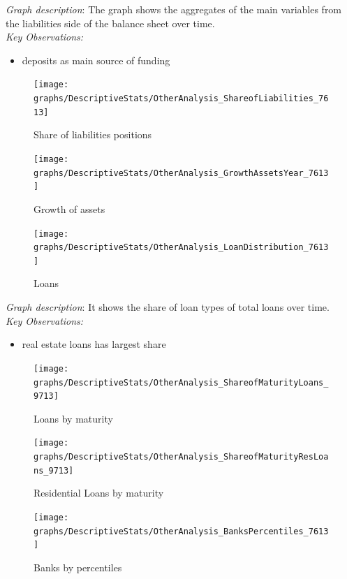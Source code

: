 \documentclass[12pt, a4paper]{article} %
\begin{document}
\noindent \textit{Graph description}: The graph shows the aggregates of the main variables from the liabilities side of the balance sheet over time.\\

\noindent \textit{Key Observations:}
\begin{itemize}
\item deposits as main source of funding
\end{itemize}


\begin{figure}[hbtp]
\centering
\caption{Share of liabilities positions}
\texttt{[image: graphs/DescriptiveStats/OtherAnalysis\_ShareofLiabilities\_7613]}
\end{figure}

\begin{figure}[hbtp]
\centering
\caption{Growth of assets}
\texttt{[image: graphs/DescriptiveStats/OtherAnalysis\_GrowthAssetsYear\_7613]}
\end{figure}


\begin{figure}[hbtp]
\centering
\caption{Loans}
\texttt{[image: graphs/DescriptiveStats/OtherAnalysis\_LoanDistribution\_7613]}
\end{figure}

\noindent \textit{Graph description}: It shows the share of loan types of total loans over time.\\

\noindent \textit{Key Observations:}
\begin{itemize}
\item real estate loans has largest share

\end{itemize}

\begin{figure}[hbtp]
\centering
\caption{Loans by maturity}
\texttt{[image: graphs/DescriptiveStats/OtherAnalysis\_ShareofMaturityLoans\_9713]}
\end{figure}


\begin{figure}[hbtp]
\centering
\caption{Residential Loans by maturity}
\texttt{[image: graphs/DescriptiveStats/OtherAnalysis\_ShareofMaturityResLoans\_9713]}
\end{figure}


\begin{figure}[hbtp]
\centering
\caption{Banks by percentiles}
\texttt{[image: graphs/DescriptiveStats/OtherAnalysis\_BanksPercentiles\_7613]}
\end{figure}
\end{document}
